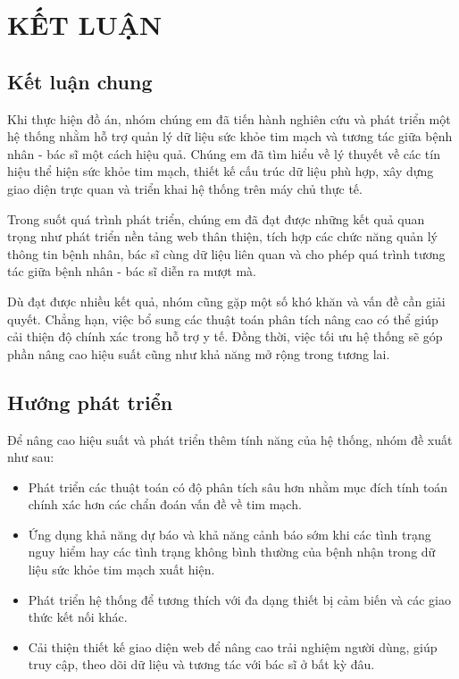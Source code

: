 
\section*{KẾT LUẬN}
\subsection*{Kết luận chung}

Khi thực hiện đồ án, nhóm chúng em đã tiến hành nghiên cứu và phát triển một hệ thống nhằm hỗ trợ quản lý dữ liệu sức khỏe tim mạch và tương tác giữa bệnh nhân - bác sĩ một cách hiệu quả.
Chúng em đã tìm hiểu về lý thuyết về các tín hiệu thể hiện sức khỏe tim mạch, thiết kế cấu trúc dữ liệu phù hợp, xây dựng giao diện trực quan và triển khai hệ thống trên máy chủ thực tế.  

Trong suốt quá trình phát triển, chúng em đã đạt được những kết quả quan trọng như phát triển nền tảng web thân thiện, tích hợp các chức năng quản lý thông tin bệnh nhân, bác sĩ cùng dữ liệu liên quan và cho phép quá trình tương tác giữa bệnh nhân - bác sĩ diễn ra mượt mà.

Dù đạt được nhiều kết quả, nhóm cũng gặp một số khó khăn và vấn đề cần giải quyết. Chẳng hạn, việc bổ sung các thuật toán phân tích nâng cao có thể giúp cải thiện độ chính xác trong hỗ trợ y tế. Đồng thời, việc tối ưu hệ thống sẽ góp phần nâng cao hiệu suất cũng như khả năng mở rộng trong tương lai.
\subsection*{Hướng phát triển}


Để nâng cao hiệu suất và phát triển thêm tính năng của hệ thống, nhóm đề xuất như sau:

\begin{adjustwidth}{1.5em}{}
	\begin{itemize}
		\item Phát triển các thuật toán có độ phân tích sâu hơn nhằm mục đích tính toán chính xác hơn các chẩn đoán vấn đề về tim mạch.

		\item Ứng dụng khả năng dự báo và khả năng cảnh báo sớm khi các tình trạng nguy hiểm hay các tình trạng không bình thường của bệnh nhận trong dữ liệu sức khỏe tim mạch xuất hiện.


		\item Phát triển hệ thống để tương thích với đa dạng thiết bị cảm biến và các giao thức kết nối khác.


		\item Cải thiện thiết kế giao diện web để nâng cao trải nghiệm người dùng, giúp truy cập, theo dõi dữ liệu và tương tác với bác sĩ ở bất kỳ đâu.

	\end{itemize}
\end{adjustwidth}


